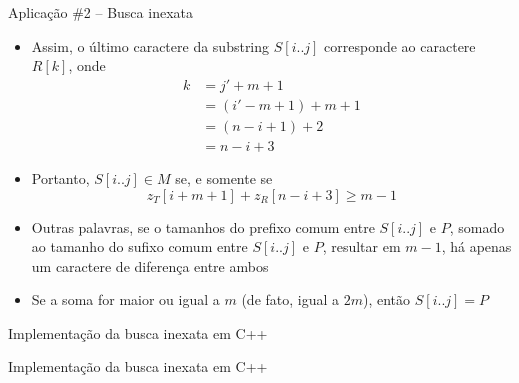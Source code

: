 \begin{frame}[fragile]{Aplicação \#2 -- Busca inexata}

    \begin{itemize}
        \item Assim, o último caractere da substring $S[i..j]$ corresponde
            ao caractere $R[k]$, onde
        \begin{align*}
            k &= j' + m + 1 \\
              &= (i' - m + 1) + m + 1 \\
              &= (n - i + 1) + 2 \\
              &= n - i + 3
        \end{align*}
        \pause

        \item Portanto, $S[i..j]\in M$ se, e somente se
        \[
            z_T[i + m + 1] + z_R[n - i + 3] \geq m - 1
        \]
        \pause

        \item Outras palavras, se o tamanhos do prefixo comum entre $S[i..j]$ e $P$, somado ao
            tamanho do sufixo comum entre $S[i..j]$ e $P$, resultar em $m - 1$, há apenas um
            caractere de diferença entre ambos
        \pause

        \item Se a soma for maior ou igual a $m$ (de fato, igual a $2m$),  então $S[i..j] = P$
    \end{itemize}

\end{frame}



\begin{frame}[fragile]{Implementação da busca inexata em C++}
\end{frame}

\begin{frame}[fragile]{Implementação da busca inexata em C++}
\end{frame}

